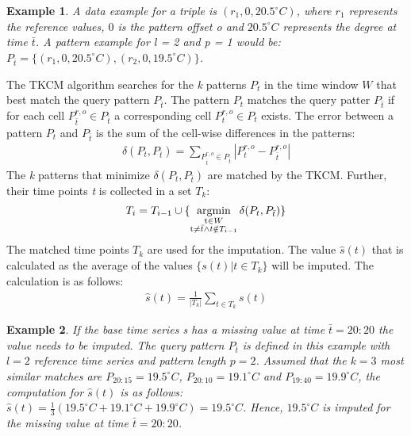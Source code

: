 \documentclass[abstracton,12pt]{scrreprt}
\begin{document}
\newtheorem{exmp}{Example}[section]
\begin{exmp}
A data example for a triple is $(r_1,0,20.5^{\circ}C)$, where $r_1$ represents the reference values, $0$ is the pattern offset \emph{o} and $20.5^{\circ}C$ represents the degree at time $\bar{t}$. A pattern example for l = 2 and p = 1 would be: $P_{\bar{t}}=\{(r_1,0,20.5^{\circ}C),(r_2,0,19.5^{\circ}C)\}$.
\end{exmp}
The TKCM algorithm searches for the \emph{k} patterns $P_t$ in the time window $W$ that best match the query pattern $P_{\bar{t}}$. The pattern $P_t$ matches the query patter $P_{\bar{t}}$ if for each cell $P_{\bar{t}}^{r,o} \in P_{\bar{t}}$ a corresponding cell  $P_{t}^{r,o} \in P_t$ exists. The error between a pattern $P_t$ and $P_{\bar{t}}$  is the sum of the cell-wise differences in the patterns:
\begin{align*}
\delta(P_{t}, P_{\bar{t}}) = \displaystyle\sum_{P_{\bar{t}}^{r,o} \in P_{\bar{t}}}^{} |P_{t}^{r,o} - P_{\bar{t}}^{r,o}|
\end{align*}
The \emph{k} patterns that minimize $\delta(P_{t}, P_{\bar{t}})$ are matched by the TKCM. Further, their time points \emph{t} is collected in a set $T_k$:
\newcommand*{\argmin}{\operatornamewithlimits{argmin}\limits}
\begin{align*}
T_i = T_{i-1} \cup \{\argmin_{%
	\substack{%
		\text t \in W \\
		\text t \neq \bar{t} \wedge t \notin T_{i-1}
	}
}	\delta(P_{t}, P_{\bar{t}})\}
\end{align*}
The matched time points $T_k$ are used for the imputation. The value $\hat{s}(t)$ that is calculated as the average of the values $\{s(t) | t \in T_k\}$ will be imputed. The calculation is as follows: 
\begin{align*}
\hat{s}(t) = \frac{1}{|T_k|} \displaystyle\sum_{t \in T_k}^{} s(t)
\end{align*}
\begin{exmp}
	If the base time series s has a missing value at time $\bar{t}=20:20$ the value needs to be imputed. The query pattern $P_{\bar{t}}$ is defined in this example with $l=2$ reference time series and pattern length $p=2$. Assumed that the $k=3$ most similar matches are $P_{20:15} = 19.5^{\circ}C$, $P_{20:10}= 19.1^{\circ}C$ and $P_{19:40} = 19.9^{\circ}C$, the computation for $\hat{s}(t)$ is as follows: $\hat{s}(t) = \frac{1}{3}(19.5^{\circ}C + 19.1^{\circ}C + 19.9^{\circ}C) = 19.5^{\circ}C$. Hence, $19.5^{\circ}C$ is imputed for the missing value at time $\bar{t}=20:20$.
\end{exmp}
\end{document}
